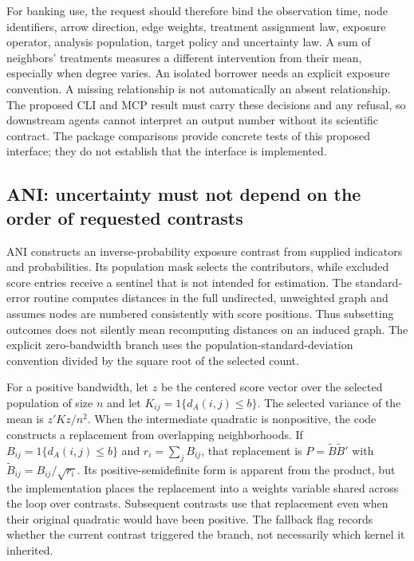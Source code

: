For banking use, the request should therefore bind the observation time, node identifiers, arrow direction, edge weights, treatment assignment law, exposure operator, analysis population, target policy and uncertainty law. A sum of neighbors' treatments measures a different intervention from their mean, especially when degree varies. An isolated borrower needs an explicit exposure convention. A missing relationship is not automatically an absent relationship. The proposed CLI and MCP result must carry these decisions and any refusal, so downstream agents cannot interpret an output number without its scientific contract. The package comparisons provide concrete tests of this proposed interface; they do not establish that the interface is implemented.\citep{exec25_pnet_choice}

\subsection{ANI: uncertainty must not depend on the order of requested contrasts}

ANI constructs an inverse-probability exposure contrast from supplied indicators and probabilities. Its population mask selects the contributors, while excluded score entries receive a sentinel that is not intended for estimation. The standard-error routine computes distances in the full undirected, unweighted graph and assumes nodes are numbered consistently with score positions. Thus subsetting outcomes does not silently mean recomputing distances on an induced graph. The explicit zero-bandwidth branch uses the population-standard-deviation convention divided by the square root of the selected count.\citep{exec25_pnet_ani}

For a positive bandwidth, let $z$ be the centered score vector over the selected population of size $n$ and let $K_{ij}=1\{d_A(i,j)\leq b\}$. The selected variance of the mean is $z'Kz/n^2$. When the intermediate quadratic is nonpositive, the code constructs a replacement from overlapping neighborhoods. If $B_{ij}=1\{d_A(i,j)\leq b\}$ and $r_i=\sum_jB_{ij}$, that replacement is $P=\widetilde B\widetilde B'$ with $\widetilde B_{ij}=B_{ij}/\sqrt{r_i}$. Its positive-semidefinite form is apparent from the product, but the implementation places the replacement into a weights variable shared across the loop over contrasts. Subsequent contrasts use that replacement even when their original quadratic would have been positive. The fallback flag records whether the current contrast triggered the branch, not necessarily which kernel it inherited.\citep{exec25_pnet_ani}

